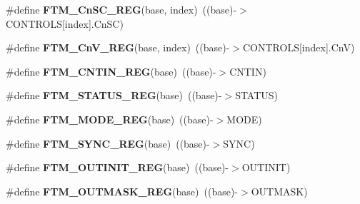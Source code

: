 \begin{DoxyCompactItemize}
\item 
\#define {\bfseries F\+T\+M\+\_\+\+Cn\+S\+C\+\_\+\+R\+EG}(base,  index)~((base)-\/$>$C\+O\+N\+T\+R\+O\+LS\mbox{[}index\mbox{]}.Cn\+SC)\hypertarget{group__FTM__Register__Accessor__Macros_gac7ab18f1e82c379833dbaf01e0541691}{}\label{group__FTM__Register__Accessor__Macros_gac7ab18f1e82c379833dbaf01e0541691}

\item 
\#define {\bfseries F\+T\+M\+\_\+\+Cn\+V\+\_\+\+R\+EG}(base,  index)~((base)-\/$>$C\+O\+N\+T\+R\+O\+LS\mbox{[}index\mbox{]}.CnV)\hypertarget{group__FTM__Register__Accessor__Macros_gade9634b08289e23283d65e0b85aa8f2b}{}\label{group__FTM__Register__Accessor__Macros_gade9634b08289e23283d65e0b85aa8f2b}

\item 
\#define {\bfseries F\+T\+M\+\_\+\+C\+N\+T\+I\+N\+\_\+\+R\+EG}(base)~((base)-\/$>$C\+N\+T\+IN)\hypertarget{group__FTM__Register__Accessor__Macros_gad2208d9641bb52d062344f3bbf467d6d}{}\label{group__FTM__Register__Accessor__Macros_gad2208d9641bb52d062344f3bbf467d6d}

\item 
\#define {\bfseries F\+T\+M\+\_\+\+S\+T\+A\+T\+U\+S\+\_\+\+R\+EG}(base)~((base)-\/$>$S\+T\+A\+T\+US)\hypertarget{group__FTM__Register__Accessor__Macros_ga4cec1a1a019e0eea5d1d57a41cfa4d20}{}\label{group__FTM__Register__Accessor__Macros_ga4cec1a1a019e0eea5d1d57a41cfa4d20}

\item 
\#define {\bfseries F\+T\+M\+\_\+\+M\+O\+D\+E\+\_\+\+R\+EG}(base)~((base)-\/$>$M\+O\+DE)\hypertarget{group__FTM__Register__Accessor__Macros_gac6721d8c0d820dfde24dad153be55136}{}\label{group__FTM__Register__Accessor__Macros_gac6721d8c0d820dfde24dad153be55136}

\item 
\#define {\bfseries F\+T\+M\+\_\+\+S\+Y\+N\+C\+\_\+\+R\+EG}(base)~((base)-\/$>$S\+Y\+NC)\hypertarget{group__FTM__Register__Accessor__Macros_gae56d9f6198c388377ce87fb5be02dfe0}{}\label{group__FTM__Register__Accessor__Macros_gae56d9f6198c388377ce87fb5be02dfe0}

\item 
\#define {\bfseries F\+T\+M\+\_\+\+O\+U\+T\+I\+N\+I\+T\+\_\+\+R\+EG}(base)~((base)-\/$>$O\+U\+T\+I\+N\+IT)\hypertarget{group__FTM__Register__Accessor__Macros_gaba20d1c0f19cccba4d31374bc26585cc}{}\label{group__FTM__Register__Accessor__Macros_gaba20d1c0f19cccba4d31374bc26585cc}

\item 
\#define {\bfseries F\+T\+M\+\_\+\+O\+U\+T\+M\+A\+S\+K\+\_\+\+R\+EG}(base)~((base)-\/$>$O\+U\+T\+M\+A\+SK)\hypertarget{group__FTM__Register__Accessor__Macros_ga109174aa9e97a6e04573071c942addda}{}\label{group__FTM__Register__Accessor__Macros_ga109174aa9e97a6e04573071c942addda}


\end{DoxyCompactItemize}
